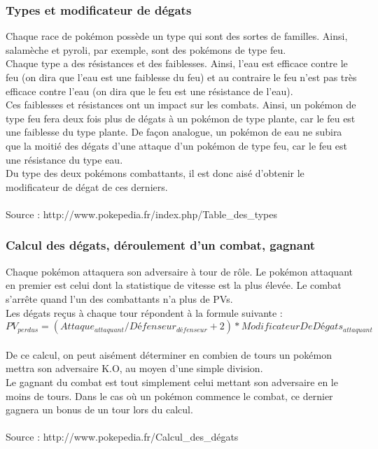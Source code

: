 \documentclass[a4paper, 12pt, final]{article}
\begin{document}
\subsubsection{Types et modificateur de dégats}
Chaque race de pokémon possède un type qui sont des sortes de familles. Ainsi, salamèche et pyroli, par exemple, sont des pokémons de type feu.\\
Chaque type a des résistances et des faiblesses. Ainsi, l'eau est efficace contre le feu (on dira que l'eau est une faiblesse du feu) et au contraire le feu n'est pas très efficace contre l'eau (on dira que le feu est une résistance de l'eau).\\
Ces faiblesses et résistances ont un impact sur les combats. Ainsi, un pokémon de type feu fera deux fois plus de dégats à un pokémon de type plante, car le feu est une faiblesse du type plante. De façon analogue, un pokémon de eau ne subira que la moitié des dégats d'une attaque d'un pokémon de type feu, car le feu est une résistance du type eau.\\
Du type des deux pokémons combattants, il est donc aisé d'obtenir le modificateur de dégat de ces derniers.\\\\
Source : http://www.pokepedia.fr/index.php/Table\_des\_types

\subsubsection{Calcul des dégats, déroulement d'un combat, gagnant}
Chaque pokémon attaquera son adversaire à tour de rôle. Le pokémon attaquant en premier est celui dont la statistique de vitesse est la plus élevée. Le combat s'arrête quand l'un des combattants n'a plus de PVs.\\
Les dégats reçus à chaque tour répondent à la formule suivante : \\$PV_{perdus} = (Attaque_{attaquant} / Défenseur_{défenseur} + 2 )*ModificateurDeDégats_{attaquant}$ \\\\
De ce calcul, on peut aisément déterminer en combien de tours un pokémon mettra son adversaire K.O, au moyen d'une simple division.\\
Le gagnant du combat est tout simplement celui mettant son adversaire en le moins de tours. Dans le cas où un pokémon commence le combat, ce dernier gagnera un bonus de un tour lors du calcul.\\\\
Source : http://www.pokepedia.fr/Calcul\_des\_dégats
\end{document}

